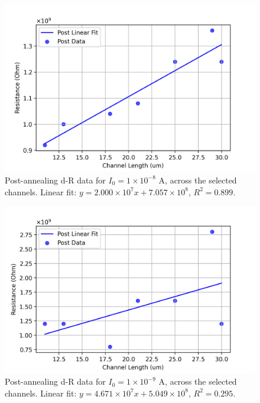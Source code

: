 \begin{figure}[H]
    \centering
    \includegraphics[width=\textwidth]{Chapter3/Figs/Raster/Sample F 2022/Post-anneal/1e-08A.png}
    \caption{Post-annealing d-R data for $I_{0}=1\times10^{-8}$ \si{\ampere}, across the selected channels. Linear fit: $y = 2.000\times10^{7}x + 7.057\times10^{8}$, $R^{2}=0.899$.}
    \label{fig:post-anneal-dr-1e-8}
\end{figure}
\begin{figure}[H]
    \centering
    \includegraphics[width=\textwidth]{Chapter3/Figs/Raster/Sample F 2022/Post-anneal/1e-09A.png}
    \caption{Post-annealing d-R data for $I_{0}=1\times10^{-9}$ \si{\ampere}, across the selected channels. Linear fit: $y = 4.671\times10^{7}x + 5.049\times10^{8}$, $R^{2}=0.295$.}
    \label{fig:post-anneal-dr-1e-9}
\end{figure}


